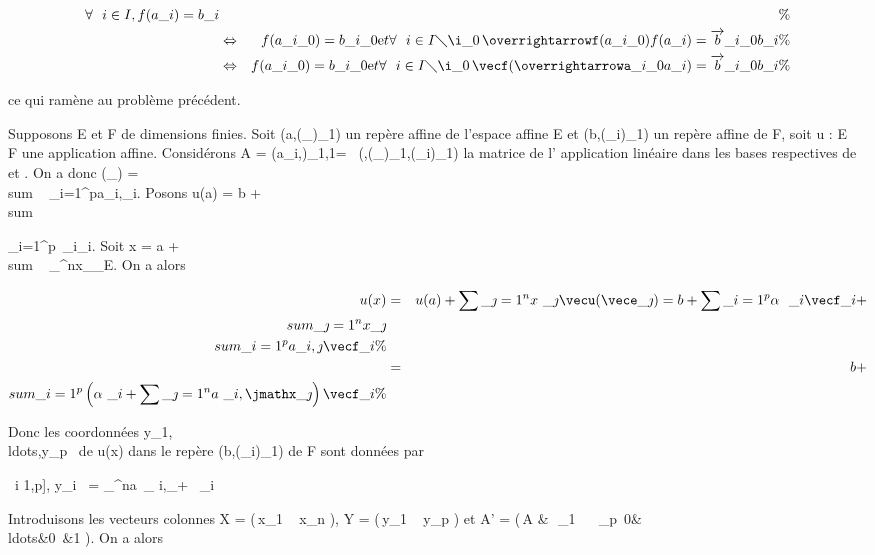 \documentclass[]{article}
\begin{document}
\begin{align*} \forall~~i \in
I,f(a\_i) = b\_i&& \%&
\\ & \Leftrightarrow &
f(a\_i\_0) =
b\_i\_0\text et
\forall~~i \in I
\diagdown\i\_0\,
\overrightarrowf(a\_i\_0)f(a\_i)
=\overrightarrow
b\_i\_0b\_i\%&
\\ & \Leftrightarrow &
f(a\_i\_0) =
b\_i\_0\text et
\forall~~i \in I
\diagdown\i\_0\,
\vecf(\overrightarrowa\_i\_0a\_i)
=\overrightarrow b\_i\_0b\_i
\%& \\ \end{align*}

ce qui ramène au problème précédent.

Supposons E et F de dimensions finies. Soit
(a,(\vece\_\jmath)\_1\leqi\leqn) un repère
affine de l'espace affine E et
(b,(\vecf\_i)\_1\leqi\leqp) un repère
affine de F, soit u : E \rightarrow~ F une application affine. Considérons A =
(a\_i,\jmath)\_1\leqi\leqp,1\leq\jmath\leqn =\
\mathrmMat
(\vecu,(\vece\_\jmath)\_1\leq\jmath\leqn,(\vecf\_i)\_1\leqi\leqp)
la matrice de l' application linéaire \vecu dans les
bases respectives de \overrightarrowE et
\overrightarrowF. On a donc
\vecu(\vece\_\jmath)
= \\sum ~
\_i=1^pa\_i,\jmath\vecf\_i.
Posons u(a) = b +\ \\sum

\_i=1^p\alpha~\_i\vecf\_i.
Soit x = a + \\sum ~
\_^nx\_\jmath\vece\_\jmath \in E.
On a alors

\begin{align*} u(x)& =& u(a) +
\sum \_\jmath=1^nx~\_
\jmath\vecu(\vece\_\jmath) = b +
\sum \_i=1^p\alpha~~\_
i\vecf\_i + \\sum
\_\jmath=1^nx\_ \jmath \\sum
\_i=1^pa\_
i,\jmath\vecf\_i\%&
\\ & =& b + \\sum
\_i=1^p\left (\alpha~\_ i +
\sum \_\jmath=1^na~\_
i,\jmathx\_\jmath\right
)\vecf\_i \%&
\\ \end{align*}

Donc les coordonnées
y\_1,\\ldots,y\_p~
de u(x) dans le repère
(b,(\vecf\_i)\_1\leqi\leqp) de F sont
données par

\forall~i \in {[}1,p{]}, y\_i~ =
\sum \_^na~\_
i,\jmathx\_\jmath + \alpha~\_i

Introduisons les vecteurs colonnes X = \left
(\matrix\,x\_1
\cr \⋮~
\cr x\_n 
\right ), Y = \left
(\matrix\,y\_1
\cr \⋮~
\cr y\_p 
\right ) et A' = \left
(\matrix\,A
&\matrix\,\alpha~\_1
\cr \⋮~
\cr \alpha~\_p \cr
\matrix\,0&\\ldots&0~&1
\right ). On a alors
\end{document}
